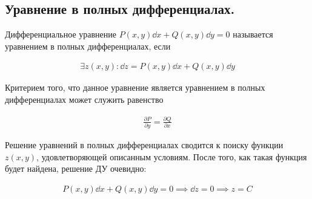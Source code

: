 \subsection{%
  Уравнение в полных дифференциалах.%
}

\begin{definition}
  Дифференциальное уравнение \(P(x, y) \dd x + Q(x, y) \dd y = 0\) называется
  уравнением в полных дифференциалах, если
  
  \begin{align*}
    \exists z(x, y) \colon \dd z = P(x, y) \dd x + Q(x, y) \dd y
  \end{align*}
\end{definition}

Критерием того, что данное уравнение является уравнением в полных
дифференциалах может служить равенство

\begin{align*}
  \frac{\partial P}{\partial y} = \frac{\partial Q}{\partial x} 
\end{align*}

Решение уравнений в полных дифференциалах сводится к поиску функции \(z(x, y)\),
удовлетворяющей описанным условиям. После того, как такая функция будет найдена,
решение ДУ очевидно:

\begin{align*}
  P(x, y) \dd x + Q(x, y) \dd y = 0
  \implies \dd z = 0
  \implies z = C
\end{align*}

